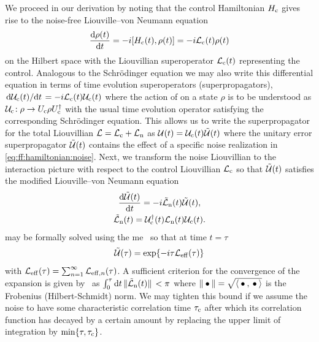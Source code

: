We proceed in our derivation by noting that the control Hamiltonian $H_{\mathrm{c}}$ gives rise to the noise-free Liouville--von Neumann equation
\begin{equation}\label{eq:liouville-von-neumann}
    \dv{\rho(t)}{t} = -\i\comm{\Hc(t)}{\rho(t)} =  -\i\Lc(t)\rho(t)
\end{equation}
on the Hilbert space \Hspace with the Liouvillian superoperator $\mathcal{L}_{\mathrm{c}}(t)$ representing the control.
Analogous to the Schrödinger equation we may also write this differential equation in terms of time evolution superoperators (superpropagators), $\dv*{\mathcal{U}_{\mathrm{c}}(t)}{t} = -i\mathcal{L}_{\mathrm{c}}(t)\mathcal{U}_{\mathrm{c}}(t)$ where the action of \liouvUc on a state $\rho$ is to be understood as $\mathcal{U}_{\mathrm{c}}\!: \rho\rightarrow U_{\mathrm{c}}\rho U_{\mathrm{c}}^\dagger$ with \Uc the usual time evolution operator satisfying the corresponding Schrödinger equation.
This allows us to write the superpropagator for the total Liouvillian $\mathcal{L} = \mathcal{L}_{\mathrm{c}} + \mathcal{L}_{\mathrm{n}}$ as $\mathcal{U}(t) = \mathcal{U}_{\mathrm{c}}(t)\mathcal{\tilde{U}}(t)$ where the unitary error superpropagator $\mathcal{\tilde{U}}(t)$ contains the effect of a specific noise realization in \cref{eq:ff:hamiltonian:noise}.
Next, we transform the noise Liouvillian \Ln to the interaction picture with respect to the control Liouvillian $\mathcal{L}_{\mathrm{c}}$ so that $\mathcal{\tilde{U}}(t)$ satisfies the modified Liouville--von Neumann equation
\begin{gather}
    \dv{\liouvUe(t)}{t} = -\i\Lnt(t)\liouvUe(t),    \label{eq:ff:le:interaction_picture} \\
    \Lnt(t) = \liouvUc^\dagger(t)\Ln(t)\liouvUc(t). \label{eq:ff:liouvillian:interaction_picture}
\end{gather}
 may be formally solved using the \acrlong{me}~\cite{Magnus1954} so that at time $t=\tau$
\begin{equation}\label{eq:ff:error_propagator}
    \mathcal{\tilde{U}}(\tau) = \exp\lbrace -i\tau\mathcal{L}_{\mathrm{eff}}(\tau)\rbrace
\end{equation}
with $\mathcal{L}_{\mathrm{eff}}(\tau) = \sum_{n=1}^\infty\mathcal{L}_{\mathrm{eff},n}(\tau)$.
A sufficient criterion for the convergence of the expansion is given by~\textcite{Moan1999} as $\int_0^\tau\dd{t}\norm*{\tilde{\mathcal{L}}_{\mathrm{n}}(t)} < \pi$ where $\norm{\:\bullet\:} = \sqrt{\expval{\:\bullet\:,\:\bullet\:}}$ is the Frobenius (Hilbert-Schmidt) norm.
We may tighten this bound if we assume the noise to have some characteristic correlation time $\tau_{\mathrm{c}}$ after which its correlation function has decayed by a certain amount by replacing the upper limit of integration by $\min\{\tau,\tau_{\mathrm{c}}\}$.

